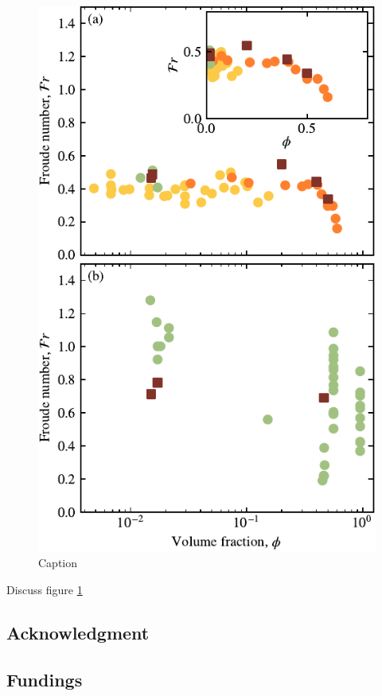 \documentclass[twocolumn]{article}
\begin{document}
\begin{figure}
	\centering
	\includegraphics{figure6.pdf}
	\caption{Caption}
	\label{fig:fig6}
\end{figure}

Discuss figure \ref{fig:fig6}


\subsection*{Acknowledgment}

\subsection*{Fundings}






\newpage
\end{document}
